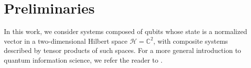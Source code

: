 \documentclass[a4paper,twocolumn,11pt,unpublished]{quantumarticle}
\newcommand{\Hilbert}{\mathcal H}
\begin{document}
\section{Preliminaries}
\label{sec:prelim}
In this work, we consider systems composed of qubits whose state is a normalized vector in a two-dimensional Hilbert space $\Hilbert = \mathbb C ^2$, with composite systems described by tensor products of such spaces. For a more general introduction to quantum information science, we refer the reader to \cite{NC00quantum}.



\end{document}
